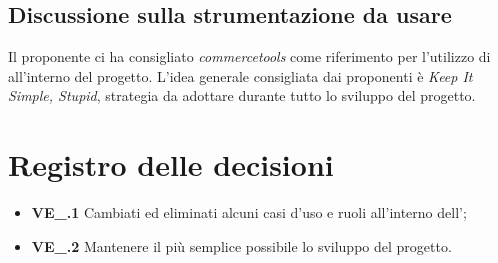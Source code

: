 \subsection{Discussione sulla strumentazione da usare}
Il proponente ci ha consigliato \textit{commercetools} come riferimento per l'utilizzo di  all'interno del progetto. L'idea generale consigliata dai proponenti è \textit{Keep It Simple, Stupid}, strategia da adottare durante tutto lo sviluppo del progetto.

\section{Registro delle decisioni}
\begin{itemize}
  \item \textbf{VE\_\Data.1} Cambiati ed eliminati alcuni casi d'uso e ruoli all'interno dell'\textit{\AdR};
  \item \textbf{VE\_\Data.2} Mantenere il più semplice possibile lo sviluppo del progetto.
\end{itemize}





